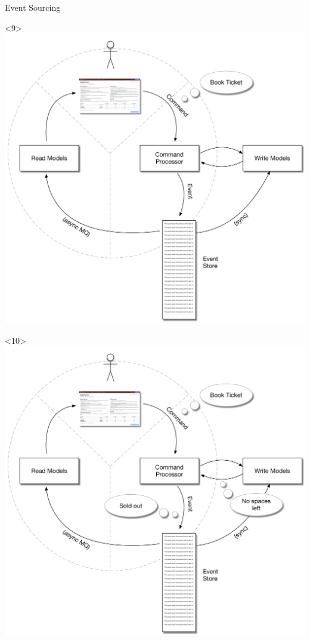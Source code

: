 \begin{frame}[fragile]{Event Sourcing}
\begin{onlyenv}
\end{onlyenv}
\begin{onlyenv}<9>
\includegraphics[width=\WIDTH]{../EventSourcing4.pdf} %
\end{onlyenv}
\begin{onlyenv}<10>
\includegraphics[width=\WIDTH]{../EventSourcing5.pdf} %
\end{onlyenv}

\end{frame}

